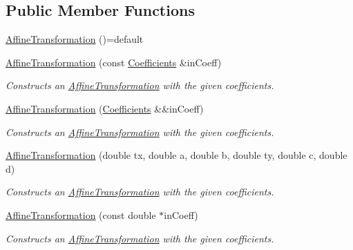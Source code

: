 \subsection*{Public Member Functions}
\begin{DoxyCompactItemize}
\item 
\hyperlink{structdg_1_1deepcore_1_1geometry_1_1_affine_transformation_afd6dcc755d93563ed9a48e91dd60fade}{Affine\+Transformation} ()=default
\item 
\hyperlink{structdg_1_1deepcore_1_1geometry_1_1_affine_transformation_ad217fdf19be738506b45d86562a61921}{Affine\+Transformation} (const \hyperlink{structdg_1_1deepcore_1_1geometry_1_1_affine_transformation_1_1_coefficients}{Coefficients} \&in\+Coeff)
\begin{DoxyCompactList}\small\item\em Constructs an \hyperlink{structdg_1_1deepcore_1_1geometry_1_1_affine_transformation}{Affine\+Transformation} with the given coefficients. \end{DoxyCompactList}\item 
\hyperlink{structdg_1_1deepcore_1_1geometry_1_1_affine_transformation_ad9a629a72e7bc4c22008734c13ed5bfd}{Affine\+Transformation} (\hyperlink{structdg_1_1deepcore_1_1geometry_1_1_affine_transformation_1_1_coefficients}{Coefficients} \&\&in\+Coeff)
\begin{DoxyCompactList}\small\item\em Constructs an \hyperlink{structdg_1_1deepcore_1_1geometry_1_1_affine_transformation}{Affine\+Transformation} with the given coefficients. \end{DoxyCompactList}\item 
\hyperlink{structdg_1_1deepcore_1_1geometry_1_1_affine_transformation_aa0bb97cf89ad95a843dc30da391ba663}{Affine\+Transformation} (double tx, double a, double b, double ty, double c, double d)
\begin{DoxyCompactList}\small\item\em Constructs an \hyperlink{structdg_1_1deepcore_1_1geometry_1_1_affine_transformation}{Affine\+Transformation} with the given coefficients. \end{DoxyCompactList}\item 
\hyperlink{structdg_1_1deepcore_1_1geometry_1_1_affine_transformation_ac8ba3233bba3b73c0526a8810e94ae60}{Affine\+Transformation} (const double $\ast$in\+Coeff)
\begin{DoxyCompactList}\small\item\em Constructs an \hyperlink{structdg_1_1deepcore_1_1geometry_1_1_affine_transformation}{Affine\+Transformation} with the given coefficients. \end{DoxyCompactList}\item 

\end{DoxyCompactItemize}

